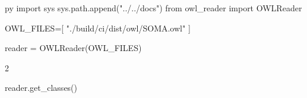 \documentclass{article}
\begin{document}
\begin{pythontexcustomcode}{py}
import sys
sys.path.append("../../docs")
from owl_reader import OWLReader

OWL_FILES=[
    "./build/ci/dist/owl/SOMA.owl"
]

reader = OWLReader(OWL_FILES)
\end{pythontexcustomcode}

\begin{multicols}{2}

\begin{pycode}
reader.get_classes()
\end{pycode}

\end{multicols}
\end{document}
